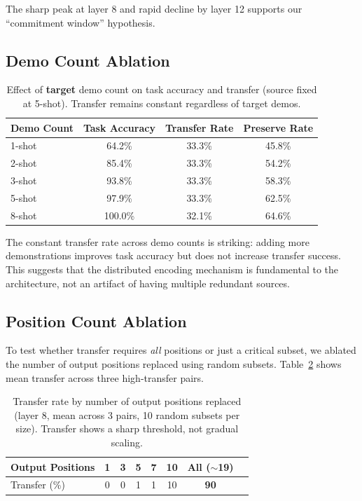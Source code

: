 \documentclass{article}
\begin{document}
The sharp peak at layer 8 and rapid decline by layer 12 supports our ``commitment window'' hypothesis.

\subsection{Demo Count Ablation}

\begin{table}[h]
\centering
\small
\caption{Effect of \textbf{target} demo count on task accuracy and transfer (source fixed at 5-shot). Transfer remains constant regardless of target demos.}
\label{tab:demo_count}
\begin{tabular}{@{}lccc@{}}
\toprule
Demo Count & Task Accuracy & Transfer Rate & Preserve Rate \\
\midrule
1-shot & 64.2\% & 33.3\% & 45.8\% \\
2-shot & 85.4\% & 33.3\% & 54.2\% \\
3-shot & 93.8\% & 33.3\% & 58.3\% \\
5-shot & 97.9\% & 33.3\% & 62.5\% \\
8-shot & 100.0\% & 32.1\% & 64.6\% \\
\bottomrule
\end{tabular}
\end{table}

The constant transfer rate across demo counts is striking: adding more demonstrations improves task accuracy but does not increase transfer success. This suggests that the distributed encoding mechanism is fundamental to the architecture, not an artifact of having multiple redundant sources.

\subsection{Position Count Ablation}

To test whether transfer requires \emph{all} positions or just a critical subset, we ablated the number of output positions replaced using random subsets. Table~\ref{tab:position_count} shows mean transfer across three high-transfer pairs.

\begin{table}[h]
\centering
\small
\caption{Transfer rate by number of output positions replaced (layer 8, mean across 3 pairs, 10 random subsets per size). Transfer shows a sharp threshold, not gradual scaling.}
\label{tab:position_count}
\begin{tabular}{@{}lccccccc@{}}
\toprule
Output Positions & 1 & 3 & 5 & 7 & 10 & All ($\sim$19) \\
\midrule
Transfer (\%) & 0 & 0 & 1 & 1 & 10 & \textbf{90} \\
\bottomrule
\end{tabular}
\end{table}
\end{document}
